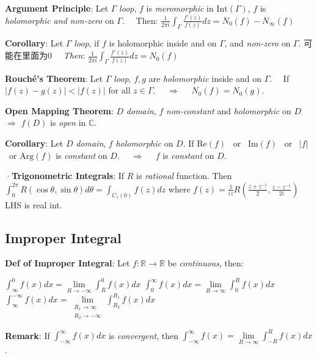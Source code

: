 \documentclass[9pt]{article}
\begin{document}
\textbf{Argument Principle}: {\small Let $\Gamma$ \textit{loop}, $f$ is \textit{meromorphic} in $\text{Int}(\Gamma)$, $f$ is \textit{holomorphic and non-zero} on $\Gamma$. \ \ Then: $\frac{1}{2\pi i}\int_{\Gamma}\frac{f'(z)}{f(z)}dz=N_0(f)-N_\infty(f)$}

\quad \textbf{Corollary}: {\small Let $\Gamma$ \textit{loop}, if $f$ is holomorphic inside and on $\Gamma$, and \textit{non-zero} on $\Gamma$. {\tiny 可能在里面为0} \ \ \textit{Then}: $\frac{1}{2\pi i}\int_{\Gamma}\frac{f'(z)}{f(z)}dz=N_0(f)$}

\textbf{Rouché's Theorem}: Let $\Gamma$ \textit{loop}, $f,g$ are \textit{holomorphic} inside and on $\Gamma$. \ \ If $|f(z)-g(z)|<|f(z)|$ for all $z\in\Gamma$. \ \ $\Rightarrow$ \ \ $N_0(f) = N_0(g)$.

\textbf{Open Mapping Theorem}: $D$ \textit{domain}, $f$ \textit{non-constant} and \textit{holomorphic} on $D$ $\Rightarrow$ $f(D)$ is \textit{open} in $\mathbb{C}$.

\quad \textbf{Corollary}: Let $D$ \textit{domain}, $f$ \textit{holomorphic} on $D$. \quad If $\text{Re}(f)$ \ or \ $\text{Im}(f)$ \ or \ $|f|$ \ or $\text{Arg}(f)$ is \textit{constant} on $D$. \ \ $\Rightarrow$ \ \ $f$ is \textit{constant} on $D$.

·\textbf{Trigonometric Integrals}: {\small If $R$ is \textit{rational} function. Then $\int_0^{2\pi}R(\cos\theta,\sin\theta)d\theta = \int_{C_1(0)}f(z)dz$ \quad where $f(z)=\frac{1}{iz}R\left(\frac{z+z^{-1}}{2},\frac{z-z^{-1}}{2i}\right)$} {\tiny LHS is real int.}


\subsection{Improper Integral} %

\textbf{Def of Improper Integral}: Let $f:\mathbb{R}\to\mathbb{R}$ be \textit{continuous}, then:

\qquad $\int_{\infty}^0 f(x)dx =\lim\limits_{R\to-\infty}\int_{R}^0 f(x)dx$ \quad $\int_{0}^{\infty}f(x)dx=\lim\limits_{R\to\infty}\int_0^R f(x)dx$ \quad $\int_{\infty}^{-\infty}f(x)dx=\lim\limits_{\substack{R_1\to\infty\\R_2\to-\infty}}\int_{R_2}^{R_1}f(x)dx$ 

\vspace{-6pt}
\quad \textbf{Remark}: If $\int_{-\infty}^{\infty}f(x)dx$ is \textit{convergent}, then $\int_{-\infty}^{\infty} f(x)=\lim\limits_{R\to\infty}\int_{-R}^{R}f(x)dx$.
\end{document}
